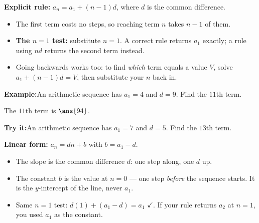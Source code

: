 \documentclass[12pt]{article}
\begin{document}


\begin{formulabox}
\textbf{Explicit rule:} $a_n = a_1 + (n-1)d$, where $d$ is the common difference.
\begin{itemize}[leftmargin=0.8cm, itemsep=1pt, topsep=2pt]
  \item The first term costs no steps, so reaching term $n$ takes $n-1$ of them.
  \item \textbf{The $n=1$ test:} substitute $n = 1$. A correct rule returns
        $a_1$ exactly; a rule using $nd$ returns the second term instead.
  \item Going backwards works too: to find \emph{which} term equals a value $V$,
        solve $a_1 + (n-1)d = V$, then substitute your $n$ back in.
\end{itemize}
\end{formulabox}

\begin{examplebox}
\textbf{Example:}\quad An arithmetic sequence has $a_1 = 4$ and $d = 9$. Find the
$11$th term.

The $11$th term is $\ans{94}$.
\end{examplebox}

\begin{tryitbox}
\textbf{Try it:}\quad An arithmetic sequence has $a_1 = 7$ and $d = 5$. Find the
$13$th term.\\[2pt]
\end{tryitbox}


\begin{formulabox}
\textbf{Linear form:} $a_n = dn + b$ with $b = a_1 - d$.
\begin{itemize}[leftmargin=0.8cm, itemsep=1pt, topsep=2pt]
  \item The slope is the common difference $d$: one step along, one $d$ up.
  \item The constant $b$ is the value at $n = 0$ --- one step \emph{before} the
        sequence starts. It is the $y$-intercept of the line, never $a_1$.
  \item Same $n=1$ test: $d(1) + (a_1 - d) = a_1$ $\checkmark$. If your rule
        returns $a_2$ at $n=1$, you used $a_1$ as the constant.
\end{itemize}
\end{formulabox}
\end{document}
